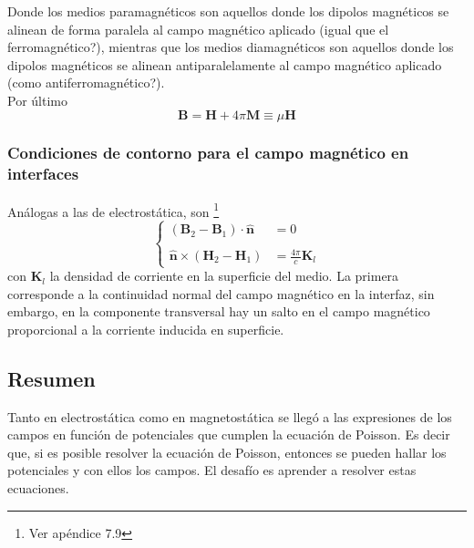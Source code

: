 Donde los medios paramagnéticos son aquellos donde los dipolos magnéticos se alinean de forma paralela al campo magnético aplicado (igual que el ferromagnético?), mientras que los medios diamagnéticos son aquellos donde los dipolos magnéticos se alinean antiparalelamente al campo magnético aplicado (como antiferromagnético?).\\
\indent Por último 
\begin{equation*}
    \textbf{B} = \textbf{H} + 4\pi \textbf{M} \equiv \mu \textbf{H}
\end{equation*}

\subsubsection{Condiciones de contorno para el campo magnético en interfaces}
Análogas a las de electrostática, son \footnote{Ver apéndice 7.9}
\begin{equation}
    \left\{
        \begin{matrix}
            (\textbf{B}_{2} - \textbf{B}_{1})\cdot \hat{\textbf{n}} & = 0\\
            & \\
            \hat{\textbf{n}}\times (\textbf{H}_{2}-\textbf{H}_{1}) & = \frac{4\pi}{c}\textbf{K}_{l}
        \end{matrix}
    \right.
    \label{ec:CondicionesdeContornoB}
\end{equation}
con $\textbf{K}_{l}$ la densidad de corriente en la superficie del medio. La primera corresponde a la continuidad normal del campo magnético en la interfaz, sin embargo, en la componente transversal hay un salto en el campo magnético proporcional a la corriente inducida en superficie.

\subsection{Resumen}
Tanto en electrostática como en magnetostática se llegó a las expresiones de los campos en función de potenciales que cumplen la ecuación de Poisson. Es decir que, si es posible resolver la ecuación de Poisson, entonces se pueden hallar los potenciales y con ellos los campos. El desafío es aprender a resolver estas ecuaciones.



